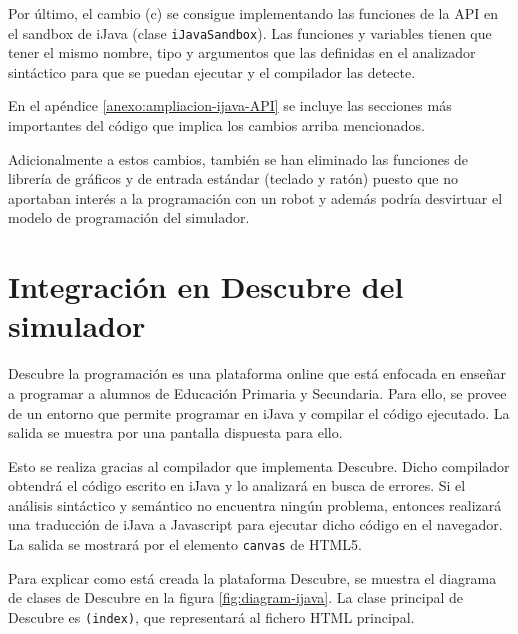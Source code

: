 Por último, el cambio (c) se consigue implementando las funciones de la API en el sandbox de iJava (clase \texttt{iJavaSandbox}). Las funciones y variables tienen que tener el mismo nombre, tipo y argumentos que las definidas en el analizador sintáctico para que se puedan ejecutar y el compilador las detecte. 

En el apéndice \ref{anexo:ampliacion-ijava-API} se incluye las secciones más importantes del código que implica los cambios arriba mencionados.


Adicionalmente a estos cambios, también se han eliminado las funciones de librería de gráficos y de entrada estándar (teclado y ratón) puesto que no aportaban interés a la programación con un robot y además podría desvirtuar el modelo de programación del simulador.


\section{Integración en Descubre del simulador}
\label{sec:integracion-descubre}


Descubre la programación\cite{descubre} es una plataforma online que está enfocada en enseñar a programar a alumnos de Educación Primaria y Secundaria. Para ello, se provee de un entorno que permite programar en iJava\cite{sanchez2009ijava} y compilar el código ejecutado. La salida se muestra por una pantalla dispuesta para ello.

Esto se realiza gracias al compilador que implementa Descubre. Dicho compilador obtendrá el código escrito en iJava y lo analizará en busca de errores. Si el análisis sintáctico y semántico no encuentra ningún problema, entonces realizará una traducción de iJava a Javascript para ejecutar dicho código en el navegador. La salida se mostrará por el elemento \texttt{canvas} de HTML5.

Para explicar como está creada la plataforma Descubre, se muestra el diagrama de clases de Descubre en la figura \ref{fig:diagram-ijava}. La clase principal de Descubre es \texttt{(index)}, que representará al fichero HTML principal.

